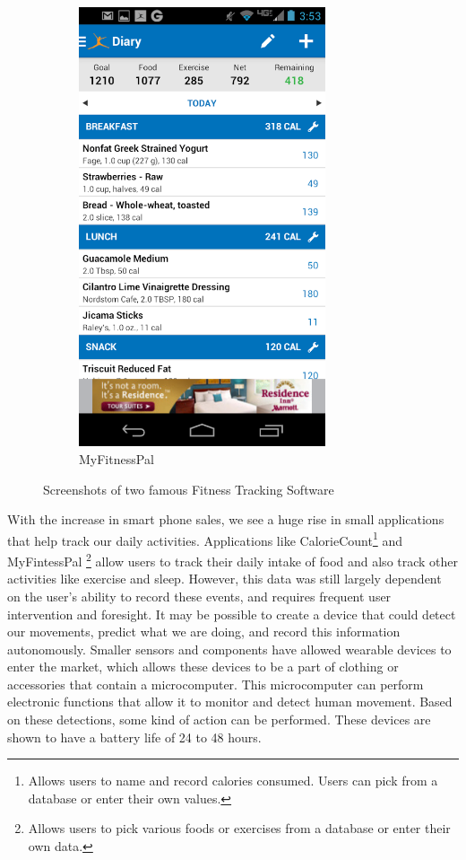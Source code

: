 \begin{figure}
\begin{subfigure}[b]{0.4\textwidth}
\includegraphics[width=0.8\textwidth]{images/MyFitScreenshot.png}
\caption{MyFitnessPal}
\label{fig:MyFitScreenshot}
\end{subfigure}
\caption{Screenshots of two famous Fitness Tracking Software}
\label{fig:FitnessScreenshots}
\end{figure}
With the increase in smart phone sales,
we see a huge rise in small applications that help track our daily activities.
Applications like CalorieCount\footnote{Allows users to name and record calories consumed.
Users can pick from a database or enter their own values.} and MyFintessPal
\footnote{Allows users to pick various foods or exercises from a database or enter their own data.}
allow users to track their daily intake of food and also track other activities like exercise and sleep.
However, this data was still largely dependent on the user's ability to record these events,
and requires frequent user intervention and foresight.
It may be possible to create a device that could detect our movements,
predict what we are doing, and record this information autonomously.
Smaller sensors and components have allowed wearable devices to enter the market,
which allows these devices to be a part of clothing or accessories that contain
a microcomputer. This microcomputer can perform electronic functions that allow it to monitor and
detect human movement. Based on these detections, some kind of action can be performed.
These devices are shown to have a battery life of 24 to 48 hours.


